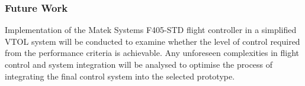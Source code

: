 \subsubsection{Future Work}
Implementation of the Matek Systems F405-STD flight controller in a simplified VTOL system will be conducted to examine whether the level of control required from the performance criteria is achievable. Any unforeseen complexities in flight control and system integration will be analysed to optimise the process of integrating the final control system into the selected prototype. 